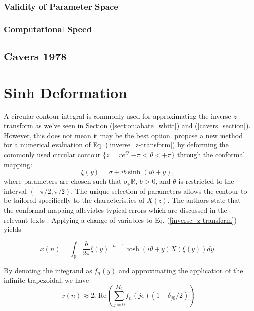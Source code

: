 \documentclass[a4paper]{report}
\begin{document}
\subsubsection{Validity of Parameter Space}


\subsubsection{Computational Speed}

\subsection{Cavers 1978}

\section{Sinh Deformation}
A circular contour integral is commonly used for approximating the inverse $z$-transform as we've seen in Section (\ref{section:abate_whitt}) and (\ref{cavers_section}). However, this does not mean it may be the best option. \citet{levendorskii2022sinh} propose a new method for a numerical evaluation of Eq. (\ref{inverse_z-transform}) by deforming the commonly used circular contour $\{z = re^{i\theta} | -\pi < \theta < +\pi\}$ through the conformal mapping:
\begin{equation}\label{equation:conformal_mapping}
    \xi(y) = \sigma + ib\sinh(i\theta + y),
\end{equation}
where parameters are chosen such that $\sigma_\in \mathbb{R}$, $b > 0$, and $\theta$ is restricted to the interval $(-\pi/2, \pi / 2)$. The unique selection of parameters allows the contour to be tailored specifically to the characteristics of $X(z)$. The authors state that the conformal mapping alleviates typical errors which are discussed in the relevant texts \citep{boyarchenko2014efficient, boyarchenko2019sinh, schmelzer2007computing}.  Applying a change of variables to Eq. (\ref{inverse_z-transform}) yields

\begin{equation}
    x(n) = \int_\mathbb{R} \frac{b}{2\pi} \xi(y)^{-n-1} \cosh(i\theta + y) X(\xi(y)) dy.
\end{equation}

By denoting the integrand as $f_n(y)$ and approximating the application of the infinite trapezoidal, we have 
\begin{equation}
    x(n) \approx 2 \epsilon\ \text{Re}\left( \sum_{j = 0}^{M_0} f_n(j \epsilon)(1 - \delta_{j0}/2) \right)
\end{equation}
\end{document}
